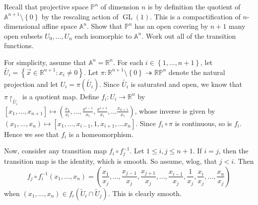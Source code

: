 \documentclass[10pt,letterpaper,cm]{nupset}
\theoremstyle{definition}
\theoremstyle{theorem}
\theoremstyle{remark}
\renewcommand{\P}{\mathbb P}
\newcommand{\R}{\mathbb{R}}
\newcommand{\RP}{\mathbb{RP}}
\newcommand{\1}{\mathbb{1}}
\newcommand{\x}{\vec x}
\newcommand{\0}{\vec 0}
\DeclareMathOperator{\GL}{GL}
\begin{document}
\begin{problem}

Recall that projective space $\P^n$ of dimension $n$ is by definition the	quotient	of $\mathbb{A}^{n+1}\setminus \left\{0\right\}$		by	the	rescaling	action	of	$\GL(1)$.	This 	is a compactification	of	$n$-dimensional affine	space	$\mathbb{A}^n$.
Show	that	$\P^n$	has	an	open	covering	by	$n+1$ many	open	subsets	$U_0,\ldots,U_n$	each	isomorphic	to $\mathbb{A}^n$.	Work	 out	all of the	transition	functions.
\end{problem}
\begin{solution}
For simplicity, assume that $\mathbb{A}^n = \mathbb{R}^n$.  For each $i \in \left\{ 1, \ldots, n+1\right\}$, let $\widetilde{U_i}= \left\{\x \in \R^{n+1} : x_i \ne 0\right\}$. Let $\pi: \R^{n+1} \setminus \left\{0\right\} \twoheadrightarrow \RP^n$ denote the natural projection and let $U_i = \pi\left(\widetilde{U_i}\right)$. Since $\widetilde{U_i}$ is saturated and open, we know that $\pi \restriction_{\widetilde{U_i}}$ is a quotient map. Define $f_i : U_i \to \R^n$ by $[x_1, \ldots, x_{n+1}] \mapsto \left(\frac{x_1}{x_i}, \ldots, \frac{x^{i-1}}{x_i}, \frac{x^{i+1}}{x_i}, \ldots \frac{x_{n+1}}{x_i}\right)$, whose inverse is given by  $\left(x_1, \ldots, x_n\right) \mapsto \left[x_1, \ldots, x_{i-1}, 1, x_{i+1}, \ldots x_n\right]$. Since $f_i \circ \pi$ is continuous, so is $f_i$. Hence we see that $f_i$ is a homeomorphism. 

\smallskip

Now, consider any transition map $f_i \circ f_j^{-1}$. 
Let $1\leq i,j\leq n+1$. If $i=j$, then the transition map is the identity, which is smooth. So assume, wlog, that $j< i$.  Then $$f_j \circ f_i^{-1}(x_1, \ldots, x_n) = \left(\frac{x_1}{x_{j}}, \ldots, \frac{x_{j-1}}{x_{j}}, \frac{x_{j+1}}{x_{j}}, \ldots, \frac{x_{i-1}}{x_{j}}, \frac{1}{x_j}, \frac{x_{i}}{x_{j}}, \ldots, \frac{x_{n}}{x_{j}}\right)$$ when $(x_1, \ldots, x_n) \in f_i\left(\widetilde{U}_i \cap \widetilde{U}_j\right)$. This is clearly smooth. 
\end{solution}
\end{document}
